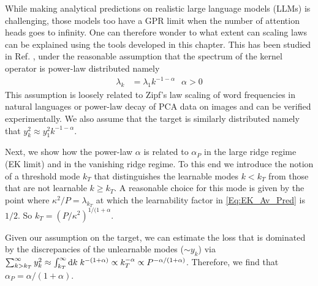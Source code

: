 While making analytical predictions on realistic large language models (LLMs) is challenging, those models too have a GPR limit when the number of attention heads goes to infinity. One can therefore wonder to what extent can scaling laws can be explained using the tools developed in this chapter. This has been studied in Ref. \cite{Bahri2024Explaining}, under the reasonable assumption that the spectrum of the kernel operator is power-law distributed namely 
\begin{align}
\lambda_k &= \lambda_1 k^{-1-\alpha} \,\,\,\ \alpha > 0 
\end{align}
This assumption is loosely related to Zipf's law scaling of word frequencies in natural languages or power-law decay of PCA data on images and can be verified experimentally. We also assume that the target is similarly distributed namely that $y^2_k \approx y_1^2 k^{-1-\alpha}$. 

Next, we show how the power-law $\alpha$ is related to $\alpha_P$ in the large ridge regime (EK limit) and in the vanishing ridge regime.  
To this end we introduce the notion of a threshold mode $k_T$ that distinguishes the learnable modes $k < k_T$ from those that are not learnable $k \ge k_T$. A reasonable choice for this mode is given by the point where $\kappa^2/P = \lambda_{k_T}$ at which the learnability factor in \ref{Eq:EK_Av_Pred} is $1/2$. So $k_T = (P/\kappa^2)^{1/(1+\alpha}$.

Given our assumption on the target, we can estimate the loss that is dominated by the discrepancies of the unlearnable modes ($\sim y_k$) via $\sum_{k > k_T}^{\infty} y^2_k \approx \int_{k_T}^{\infty} \text{d} k \; k^{-(1+\alpha)} \propto k_T^{-\alpha} \propto P^{-\alpha/(1+\alpha)}$. Therefore, we find that $\alpha_P=\alpha/(1+\alpha)$. 

